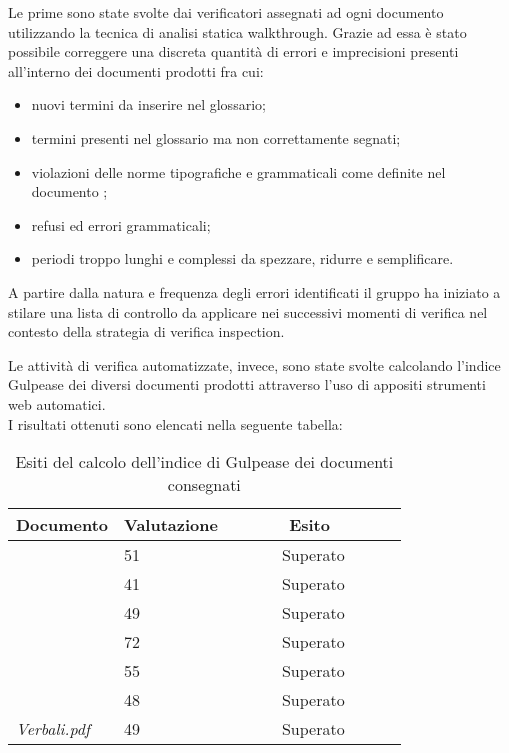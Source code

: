 		Le prime sono state svolte dai verificatori assegnati ad ogni documento utilizzando la tecnica di 					analisi statica walkthrough. Grazie ad essa è stato possibile correggere una discreta quantità di 					errori e imprecisioni presenti all'interno dei documenti prodotti fra cui: 
		\begin{itemize}	
			\item nuovi termini da inserire nel glossario;
			\item termini presenti nel glossario ma non correttamente segnati;
			\item violazioni delle norme tipografiche e grammaticali come definite nel documento \NdP ;
			\item refusi ed errori grammaticali;
			\item periodi troppo lunghi e complessi da spezzare, ridurre e semplificare.
		\end{itemize}
		A partire dalla natura e frequenza degli errori identificati il gruppo ha iniziato a stilare una lista
		di controllo da applicare nei successivi momenti di verifica nel contesto della strategia di verifica
		inspection.

		Le attività di verifica automatizzate, invece, sono state svolte calcolando l'indice Gulpease dei 	
		diversi documenti prodotti attraverso l'uso di appositi strumenti web automatici. 
		\\I risultati ottenuti sono elencati nella seguente tabella:
		\begin{table}[H]
		\begin{tabular}{|l|l|l|}
		\hline
		\textbf{Documento} 		&\textbf{Valutazione} &\textbf{~~~~~~Esito~~~~~~} \\
		\hline
		\PdQ 					&51		&~~~~~~Superato~~~~~~\\
		\NdP 					&41		&~~~~~~Superato~~~~~~\\
		\SdF 					&49		&~~~~~~Superato~~~~~~\\	
		\AdR 					&72		&~~~~~~Superato~~~~~~\\
		\PdP 					&55		&~~~~~~Superato~~~~~~\\
		\Glossario 				&48		&~~~~~~Superato~~~~~~\\
		\textit{Verbali.pdf} 		&49		&~~~~~~Superato~~~~~~\\
		\hline
		\end{tabular}
		\caption{Esiti del calcolo dell'indice di Gulpease dei documenti consegnati}
		\end{table}
		
